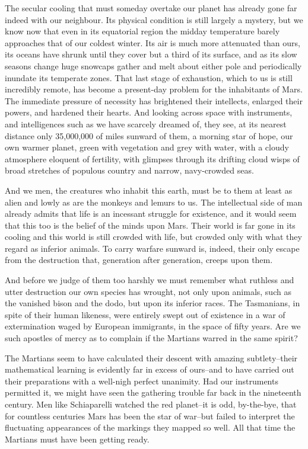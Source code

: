 The secular cooling that must someday overtake our planet has
already gone far indeed with our neighbour. Its physical condition
is still largely a mystery, but we know now that even in its
equatorial region the midday temperature barely approaches that of
our coldest winter. Its air is much more attenuated than ours, its
oceans have shrunk until they cover but a third of its surface, and
as its slow seasons change huge snowcaps gather and melt about
either pole and periodically inundate its temperate zones. That
last stage of exhaustion, which to us is still incredibly remote,
has become a present-day problem for the inhabitants of Mars. The
immediate pressure of necessity has brightened their intellects,
enlarged their powers, and hardened their hearts. And looking
across space with instruments, and intelligences such as we have
scarcely dreamed of, they see, at its nearest distance only
35,000,000 of miles sunward of them, a morning star of hope, our
own warmer planet, green with vegetation and grey with water, with
a cloudy atmosphere eloquent of fertility, with glimpses through
its drifting cloud wisps of broad stretches of populous country and
narrow, navy-crowded seas.

And we men, the creatures who inhabit this earth, must be to them
at least as alien and lowly as are the monkeys and lemurs to us.
The intellectual side of man already admits that life is an
incessant struggle for existence, and it would seem that this too
is the belief of the minds upon Mars. Their world is far gone in
its cooling and this world is still crowded with life, but crowded
only with what they regard as inferior animals. To carry warfare
sunward is, indeed, their only escape from the destruction that,
generation after generation, creeps upon them.

And before we judge of them too harshly we must remember what
ruthless and utter destruction our own species has wrought, not
only upon animals, such as the vanished bison and the dodo, but
upon its inferior races. The Tasmanians, in spite of their human
likeness, were entirely swept out of existence in a war of
extermination waged by European immigrants, in the space of fifty
years. Are we such apostles of mercy as to complain if the Martians
warred in the same spirit?

The Martians seem to have calculated their descent with amazing
subtlety--their mathematical learning is evidently far in excess of
ours--and to have carried out their preparations with a well-nigh
perfect unanimity. Had our instruments permitted it, we might have
seen the gathering trouble far back in the nineteenth century. Men
like Schiaparelli watched the red planet--it is odd, by-the-bye,
that for countless centuries Mars has been the star of war--but
failed to interpret the fluctuating appearances of the markings
they mapped so well. All that time the Martians must have been
getting ready.

